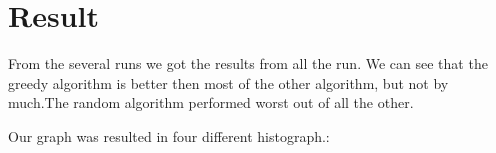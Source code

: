 \chapter{Result}
From the several runs we got the results from all the run. We can see that the greedy algorithm is better then most of the other algorithm, but not by much.The random algorithm performed worst out of all the other. 


Our graph was resulted in four different histograph.:

